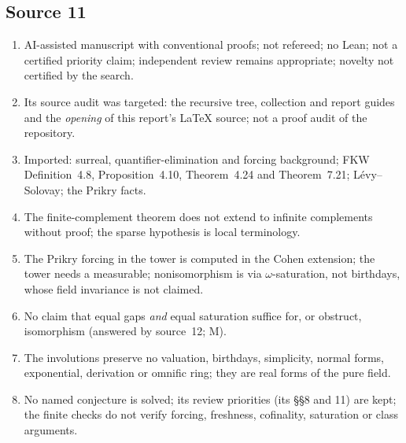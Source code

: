 \documentclass[11pt,letterpaper]{article}
\numberwithin{equation}{section}
\theoremstyle{definition}
\theoremstyle{remark}
\begin{document}
\subsection*{Source 11}
\begin{enumerate}[label=11.\arabic*,leftmargin=3.2em]
\item AI-assisted manuscript with conventional proofs; not refereed; no Lean; not a certified priority
claim; independent review remains appropriate; novelty not certified by the search.
\item Its source audit was targeted: the recursive tree, collection and report guides and the
\emph{opening} of this report's LaTeX source; not a proof audit of the repository.
\item Imported: surreal, quantifier-elimination and forcing background; FKW Definition~4.8,
Proposition~4.10, Theorem~4.24 and Theorem~7.21; Lévy--Solovay; the Prikry facts.
\item The finite-complement theorem does not extend to infinite complements without proof; the sparse
hypothesis is local terminology.
\item The Prikry forcing in the tower is computed in the Cohen extension; the tower needs a measurable;
nonisomorphism is via $\omega$-saturation, not birthdays, whose field invariance is not claimed.
\item No claim that equal gaps \emph{and} equal saturation suffice for, or obstruct, isomorphism
(answered by source~12; M).
\item The involutions preserve no valuation, birthdays, simplicity, normal forms, exponential,
derivation or omnific ring; they are real forms of the pure field.
\item No named conjecture is solved; its review priorities (its §§8 and 11) are kept; the finite checks
do not verify forcing, freshness, cofinality, saturation or class arguments.
\end{enumerate}
\end{document}
